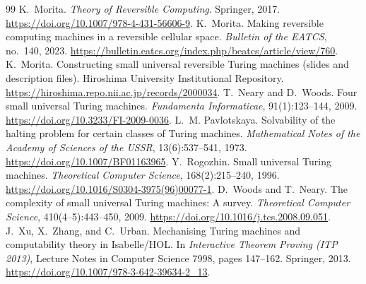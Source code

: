 \documentclass{article}
\theoremstyle{definition}
\theoremstyle{remark}
\begin{document}
\begin{thebibliography}{99}
 K.~Morita. \textit{Theory of Reversible Computing}. Springer, 2017. \url{https://doi.org/10.1007/978-4-431-56606-9}.
 K.~Morita. Making reversible computing machines in a reversible cellular space. \textit{Bulletin of the EATCS}, no.~140, 2023. \url{https://bulletin.eatcs.org/index.php/beatcs/article/view/760}.
 K.~Morita. Constructing small universal reversible Turing machines (slides and description files). Hiroshima University Institutional Repository. \url{https://hiroshima.repo.nii.ac.jp/records/2000034}.
 T.~Neary and D.~Woods. Four small universal Turing machines. \textit{Fundamenta Informaticae}, 91(1):123--144, 2009. \url{https://doi.org/10.3233/FI-2009-0036}.
 L.~M. Pavlotskaya. Solvability of the halting problem for certain classes of Turing machines. \textit{Mathematical Notes of the Academy of Sciences of the USSR}, 13(6):537--541, 1973. \url{https://doi.org/10.1007/BF01163965}.
 Y.~Rogozhin. Small universal Turing machines. \textit{Theoretical Computer Science}, 168(2):215--240, 1996. \url{https://doi.org/10.1016/S0304-3975(96)00077-1}.
 D.~Woods and T.~Neary. The complexity of small universal Turing machines: A survey. \textit{Theoretical Computer Science}, 410(4--5):443--450, 2009. \url{https://doi.org/10.1016/j.tcs.2008.09.051}.
 J.~Xu, X.~Zhang, and C.~Urban. Mechanising Turing machines and computability theory in Isabelle/HOL. In \textit{Interactive Theorem Proving (ITP 2013)}, Lecture Notes in Computer Science 7998, pages 147--162. Springer, 2013. \url{https://doi.org/10.1007/978-3-642-39634-2_13}.
\end{thebibliography}
\end{document}

